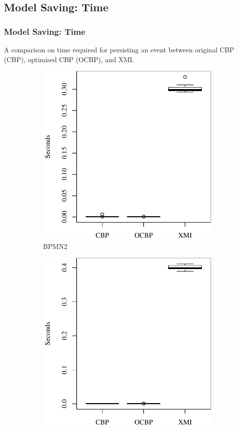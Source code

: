 \documentclass{beamer}
\begin{document}
\begin{frame}[fragile]
\section{Model Saving: Time}
\frametitle{Model Saving: Time}
A comparison on time required for persisting an event between original CBP (CBP), optimised CBP (OCBP), and XMI.
\begin{figure}[t]
    \begin{subfigure}{0.325\textwidth}
        \centering
        \includegraphics[width=\linewidth]{save_time_bpmn2}
        \caption{BPMN2}
        \label{fig:save_time_bpmn2}
    \end{subfigure}
    \hfill
    \begin{subfigure}{0.325\textwidth}
        \centering
        \includegraphics[width=\linewidth]{save_time_epsilon}

\end{subfigure}
\end{figure}
\end{frame}
\end{document}
